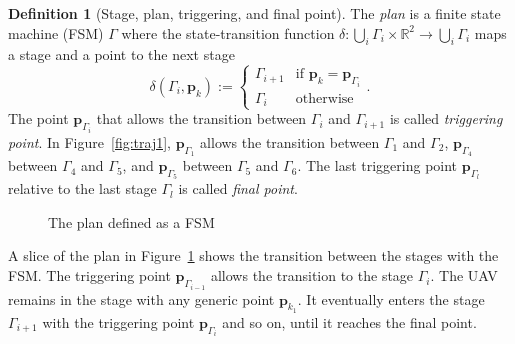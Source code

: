 \documentclass[letterpaper,10pt,conference]{ieeeconf}
\theoremstyle{definition}
\newtheorem{defn}{Definition}[section]
\begin{document}
\begin{defn}[Stage, plan, triggering, and final point]
  The \emph{plan} is a finite state machine (FSM) $\Gamma$ where the state-transition function $\delta:\bigcup_i{\Gamma_i}\times\mathbb{R}^2\rightarrow\bigcup_i{\Gamma_i}$ maps a stage and a point to the next stage
  \begin{equation*}\delta(\Gamma_i,\mathbf{p}_k):=\begin{cases}
    \Gamma_{i+1} & \text{if }\mathbf{p}_k=\mathbf{p}_{\Gamma_i}\\
    \Gamma_i & \text{otherwise}
  \end{cases}.\end{equation*}
  The point $\mathbf{p}_{\Gamma_{i}}$ that allows the transition between $\Gamma_i$ and $\Gamma_{i+1}$ is called \emph{triggering point}. In Figure~\ref{fig:traj1}, $\mathbf{p}_{\Gamma_1}$ allows the transition between $\Gamma_1$ and $\Gamma_2$, $\mathbf{p}_{\Gamma_4}$ between $\Gamma_4$ and $\Gamma_5$, and $\mathbf{p}_{\Gamma_5}$ between $\Gamma_5$ and $\Gamma_6$. The last triggering point $\mathbf{p}_{\Gamma_{l}}$ relative to the last stage $\Gamma_l$ is called \emph{final point}.
\end{defn}

\begin{figure}[h]
  \center
  \caption{The plan defined as a FSM}
  \label{fig:state-machine}
\end{figure}

A slice of the plan in Figure~\ref{fig:state-machine} shows the transition between the stages with the FSM. The triggering point $\mathbf{p}_{\Gamma_{i-1}}$ allows the transition to the stage $\Gamma_i$. The UAV remains in the stage with any generic point $\mathbf{p}_{k_1}$. It eventually enters the stage $\Gamma_{i+1}$ with the triggering point $\mathbf{p}_{\Gamma_i}$ and so on, until it reaches the final point.
\end{document}
